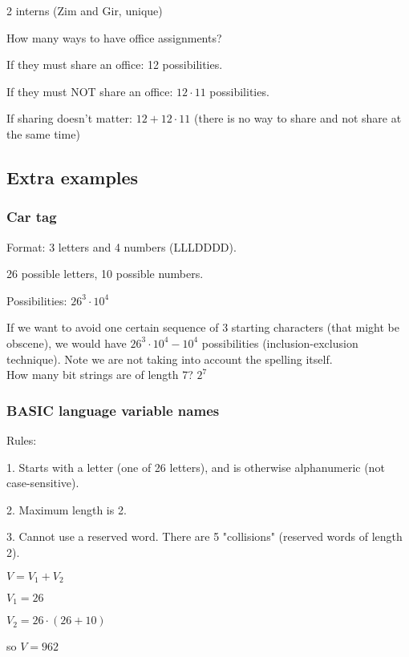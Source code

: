 \documentclass[english,openany]{book}
\begin{document}
    2 interns (Zim and Gir, unique)

    How many ways to have office assignments?

    If they must share an office: 12 possibilities.

    If they must NOT share an office: $12 \cdot 11$ possibilities.

    If sharing doesn't matter: $12 + 12 \cdot 11$ (there is no way to share and not share at the same time)\\

    \subsection{Extra examples}

    \subsubsection{Car tag}

    Format: 3 letters and 4 numbers (LLLDDDD).

    26 possible letters, 10 possible numbers.

    Possibilities: $26^3 \cdot 10^4$

    If we want to avoid one certain sequence of 3 starting characters (that might be obscene), we would have $26^3 \cdot 10^4 - 10^4$ possibilities (inclusion-exclusion technique). Note we are not taking into account the spelling itself.\\

    How many bit strings are of length 7? $2^7$\\

    \subsubsection{BASIC language variable names}

    Rules:

    1. Starts with a letter (one of 26 letters), and is otherwise alphanumeric (not case-sensitive).

    2. Maximum length is 2.

    3. Cannot use a reserved word. There are 5 "collisions" (reserved words of length 2).

    $V = V_1 + V_2$

    $V_1 = 26$

    $V_2 = 26 \cdot (26+10)$

    so $V = 962$
\end{document}
